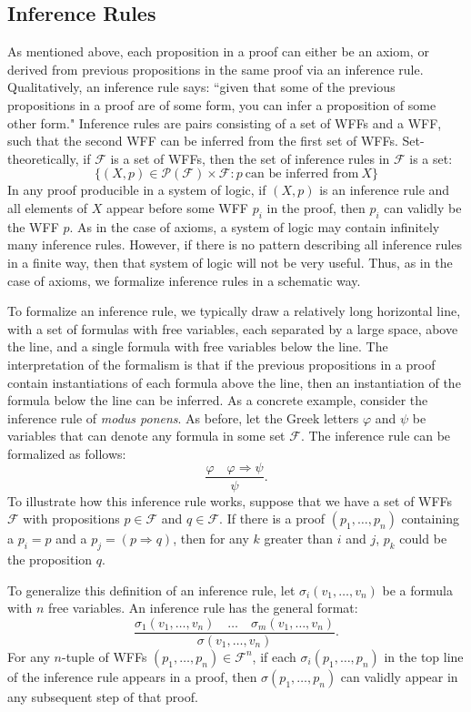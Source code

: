 \documentclass[11pt]{article}
\theoremstyle{definition}
\theoremstyle{remark}
\begin{document}
\subsection{Inference Rules}
As mentioned above, each proposition in a proof can either be an axiom, or derived from previous propositions in the same proof via an inference rule. Qualitatively, an inference rule says: ``given that some of the previous propositions in a proof are of some form, you can infer a proposition of some other form." Inference rules are pairs consisting of a set of WFFs and a WFF, such that the second WFF can be inferred from the first set of WFFs. Set-theoretically, if $\mathcal{F}$ is a set of WFFs, then the set of inference rules in $\mathcal{F}$ is a set:
$$\{(X,p)\in \mathcal{P}(\mathcal{F})\times \mathcal{F}: p \ \text{can be inferred from} \ X\}$$
In any proof producible in a system of logic, if $(X,p)$ is an inference rule and all elements of $X$ appear before some WFF $p_{i}$ in the proof, then $p_{i}$ can validly be the WFF $p$. As in the case of axioms, a system of logic may contain infinitely many inference rules. However, if there is no pattern describing all inference rules in a finite way, then that system of logic will not be very useful. Thus, as in the case of axioms, we formalize inference rules in a schematic way.

To formalize an inference rule, we typically draw a relatively long horizontal line, with a set of formulas with free variables, each separated by a large space, above the line, and a single formula with free variables below the line. The interpretation of the formalism is that if the previous propositions in a proof contain instantiations of each formula above the line, then an instantiation of the formula below the line can be inferred. As a concrete example, consider the inference rule of \textit{modus ponens}. As before, let the Greek letters $\varphi$ and $\psi$ be variables that can denote any formula in some set $\mathcal{F}$. The inference rule can be formalized as follows:
$$\frac{\varphi \quad \varphi \Rightarrow \psi}{\psi}.$$
To illustrate how this inference rule works, suppose that we have a set of WFFs $\mathcal{F}$ with propositions $p\in\mathcal{F}$ and $q\in\mathcal{F}$. If there is a proof $(p_{1},\dots,p_{n})$ containing a $p_{i}=p$ and a $p_{j}=(p\Rightarrow q)$, then for any $k$ greater than $i$ and $j$, $p_{k}$ could be the proposition $q$.\par

To generalize this definition of an inference rule, let $\sigma_{i}(v_{1},\dots,v_{n})$ be a formula with $n$ free variables. An inference rule has the general format:
$$\frac{\sigma_{1}(v_{1},\dots,v_{n}) \quad \dots \quad \sigma_{m}(v_{1},\dots,v_{n})}{\sigma(v_{1},\dots,v_{n})}.$$
For any $n$-tuple of WFFs $(p_{1},\dots,p_{n})\in\mathcal{F}^{n}$, if each $\sigma_{i}(p_{1},\dots,p_{n})$ in the top line of the inference rule appears in a proof, then $\sigma(p_{1},\dots,p_{n})$ can validly appear in any subsequent step of that proof.\par
\end{document}
